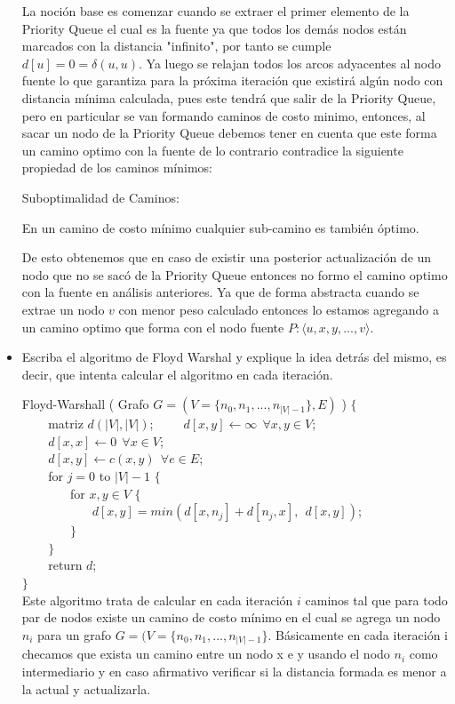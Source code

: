 \documentclass[a4paper,12pt]{article}
\begin{document}
\begin{itemize}
La noción base es comenzar cuando se extraer el primer elemento de la Priority Queue el cual es la fuente ya que todos los demás nodos están marcados con la distancia "infinito", por tanto se cumple $d[u]=0=\delta(u,u)$. Ya luego se relajan todos los arcos adyacentes al nodo fuente lo que garantiza para la próxima iteración que existirá algún nodo con distancia mínima calculada, pues este tendrá que salir de la Priority Queue, pero en particular se van formando caminos de costo minimo, entonces, al sacar un nodo de la Priority Queue debemos tener en cuenta que este forma un camino optimo con la fuente de lo contrario contradice la siguiente propiedad de los caminos mínimos:
\begin{center}
\begin{center} Suboptimalidad de Caminos: \end{center} En un camino de costo mínimo cualquier sub-camino es también óptimo.
\end{center}

De esto obtenemos que en caso de existir una posterior actualización de un nodo que no se sacó de la Priority Queue entonces no formo el camino optimo con la fuente en análisis anteriores. Ya que de forma abstracta cuando se extrae un nodo $v$ con menor peso calculado entonces lo estamos agregando a un camino optimo que forma con el nodo fuente $P: \langle u, x, y, ..., v \rangle$.

\item Escriba el algoritmo de Floyd Warshal y explique la idea detrás del mismo, es decir, que intenta calcular el algoritmo en cada iteración.

Floyd-Warshall ( Grafo $G = (V=\{n_0,n_1,...,n_{|V|-1}\},E)$ ) $\{$ \\
$~~~~~~~~$ matriz $d(|V|,|V|)$;
$~~~~~~~~$ $d[x,y] \leftarrow \infty ~~ \forall x,y \in V$;\\
$~~~~~~~~$ $d[x,x] \leftarrow 0~~ \forall x \in V$;\\
$~~~~~~~~$ $d[x,y] \leftarrow c(x,y)~~ \forall e \in E$;\\
$~~~~~~~~$ for $j=0$ to $|V|-1$ $\{$\\
$~~~~~~~~~~~~~~~~$ for $x,y \in V$ $\{$\\
$~~~~~~~~~~~~~~~~~~~~~~~~$ $d[x,y] = min( d[x, n_j] + d[n_j, x],~~ d[x,y] )$;\\
$~~~~~~~~~~~~~~~~$ $\}$\\
$~~~~~~~~$ $\}$\\
$~~~~~~~~$ return $d$;\\
$\}$\\

Este algoritmo trata de calcular en cada iteración $i$ caminos tal que para todo par de nodos existe un camino de costo mínimo en el cual se agrega un nodo $n_i$ para un grafo $G = (V=\{n_0,n_1,...,n_{|V|-1}\}$. Básicamente en cada iteración i checamos que exista un camino entre un nodo x e y usando el nodo $n_i$ como intermediario y en caso afirmativo verificar si la distancia formada es menor a la actual y actualizarla. 

\end{itemize}
\end{document}
